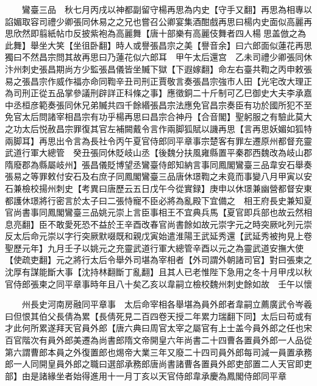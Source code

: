 　　鸞臺三品　秋七月丙戌以神都副留守楊再思為内史【守手又翻】再思為相專以諂媚取容司禮少卿張同休易之之兄也嘗召公卿宴集酒酣戲再思曰楊内史面似高麗再思欣然即翦紙帖巾反披紫袍為高麗舞【唐十部樂有高麗伎舞者四人楊思盖倣之為此舞】舉坐大笑【坐徂卧翻】時人或譽張昌宗之美【譽音余】曰六郎面似蓮花再思獨曰不然昌宗問其故再思曰乃蓮花似六郎耳　甲午太后還宫　乙未司禮少卿張同休汴州刺史張昌期尚方少監張昌儀皆坐贓下獄【下遐嫁翻】命左右臺共鞫之丙申敕張易之張昌宗作威作福亦命同鞫辛丑司刑正賈敬言奏張昌宗強市人田【光宅改大理正為司刑正從五品掌參議刑辟詳正科條之事】應徵銅二十斤制可乙巳御史大夫李承嘉中丞桓彦範奏張同休兄弟贓共四千餘緡張昌宗法應免官昌宗奏臣有功於國所犯不至免官太后問諸宰相昌宗有功乎楊再思曰昌宗合神丹【合音閣】聖躬服之有驗此莫大之功太后悦赦昌宗罪復其官左補闕戴令言作兩脚狐賦以譏再思【言再思妖媚如狐特兩脚耳】再思出令言為長社令丙午夏官侍郎同平章事宗楚客有罪左遷原州都督充靈武道行軍大總管　癸丑張同休貶岐山丞【後魏分扶風雍縣置平秦郡西魏改為岐山郡隋廢郡為縣屬岐州】張昌儀貶博望丞鸞臺侍郎知納言事同鳳閣鸞臺三品韋安石舉奏張易之等罪敕付安石及右庶子同鳳閣鸞臺三品唐休璟鞫之未竟而事變八月甲寅以安石兼檢校揚州刺史【考異曰唐歷云五日戊午今從實録】庚申以休璟兼幽營都督安東都護休璟將行密言於太子曰二張恃寵不臣必將為亂殿下宜備之　相王府長史兼知夏官尚書事同鳳閣鸞臺三品姚元崇上言臣事相王不宜典兵馬【夏官即兵部也故云然相息亮翻】臣不敢愛死恐不益於王辛酉改春官尚書餘如故元崇字元之時突厥叱列元崇反太后命元崇以字行突厥默啜既和親戊寅始遣淮陽王武延秀還【武延秀被拘見上卷聖歷元年】九月壬子以姚元之充靈武道行軍大總管辛酉以元之為靈武道安撫大使【使疏吏翻】元之將行太后令舉外司堪為宰相者【外司謂外朝諸司官】對曰張柬之沈厚有謀能斷大事【沈持林翻斷丁亂翻】且其人已老惟陛下急用之冬十月甲戌以秋官侍郎張柬之同平章事時年且八十矣乙亥以韋嗣立檢校魏州刺史餘如故　壬午以懷

　　州長史河南房融同平章事　太后命宰相各舉堪為員外郎者韋嗣立薦廣武令岑羲曰但恨其伯父長倩為累【長倩死見二百四卷天授二年累力瑞翻下同】太后曰苟或有才此何所累遂拜天官員外郎【唐六典曰周官太宰之屬官有上士盖今員外郎之任也宋百官階次有員外郎美遷為尚書郎隋文帝開皇六年尚書二十四曹各置員外郎一人品從第六謂曹郎本員之外復置郎也焬帝大業三年又廢二十四司員外郎每司減一員置承務郎一人同開皇員外郎之職曰選部承務郎唐尚書諸曹各置員外郎吏部置二人天官即吏部】由是諸緣坐者始得進用十一月丁亥以天官侍郎韋承慶為鳳閣侍郎同平章

